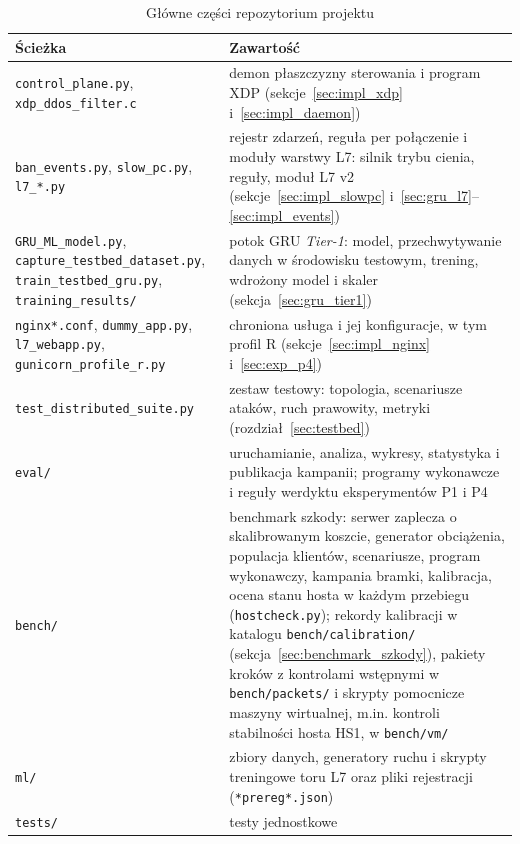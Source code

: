 \documentclass[a4paper,12pt]{article}
\begin{document}
\begin{table}[H]
\centering
\footnotesize
\caption{Główne części repozytorium projektu}\label{tab:repo}
\begin{tabularx}{\linewidth}{@{}L{5.2cm}Y@{}}
\toprule
Ścieżka & Zawartość \\
\midrule
\texttt{control\_plane.py}, \texttt{xdp\_ddos\_filter.c} & demon płaszczyzny sterowania i program XDP (sekcje~\ref{sec:impl_xdp} i~\ref{sec:impl_daemon}) \\
\texttt{ban\_events.py}, \texttt{slow\_pc.py}, \texttt{l7\_*.py} & rejestr zdarzeń, reguła per połączenie i moduły warstwy L7: silnik trybu cienia, reguły, moduł L7 v2 (sekcje~\ref{sec:impl_slowpc} i~\ref{sec:gru_l7}--\ref{sec:impl_events}) \\
\texttt{GRU\_ML\_model.py}, \texttt{capture\_\allowbreak testbed\_\allowbreak dataset.py}, \texttt{train\_\allowbreak testbed\_\allowbreak gru.py}, \texttt{training\_\allowbreak results/} & potok GRU \textit{Tier-1}: model, przechwytywanie danych w środowisku testowym, trening, wdrożony model i skaler (sekcja~\ref{sec:gru_tier1}) \\
\texttt{nginx*.conf}, \texttt{dummy\_app.py}, \texttt{l7\_webapp.py}, \texttt{gunicorn\_\allowbreak profile\_r.py} & chroniona usługa i jej konfiguracje, w tym profil R (sekcje~\ref{sec:impl_nginx} i~\ref{sec:exp_p4}) \\
\texttt{test\_\allowbreak distributed\_\allowbreak suite.py} & zestaw testowy: topologia, scenariusze ataków, ruch prawowity, metryki (rozdział~\ref{sec:testbed}) \\
\texttt{eval/} & uruchamianie, analiza, wykresy, statystyka i publikacja kampanii; programy wykonawcze i reguły werdyktu eksperymentów P1 i P4 \\
\texttt{bench/} & benchmark szkody: serwer zaplecza o skalibrowanym koszcie, generator obciążenia, populacja klientów, scenariusze, program wykonawczy, kampania bramki, kalibracja, ocena stanu hosta w każdym przebiegu (\texttt{hostcheck.py}); rekordy kalibracji w katalogu \texttt{bench/\allowbreak calibration/} (sekcja~\ref{sec:benchmark_szkody}), pakiety kroków z kontrolami wstępnymi w \texttt{bench/\allowbreak packets/} i skrypty pomocnicze maszyny wirtualnej, m.in. kontroli stabilności hosta HS1, w \texttt{bench/\allowbreak vm/} \\
\texttt{ml/} & zbiory danych, generatory ruchu i skrypty treningowe toru L7 oraz pliki rejestracji (\texttt{*prereg*.json}) \\
\texttt{tests/} & testy jednostkowe \\

\end{tabularx}
\end{table}
\end{document}
